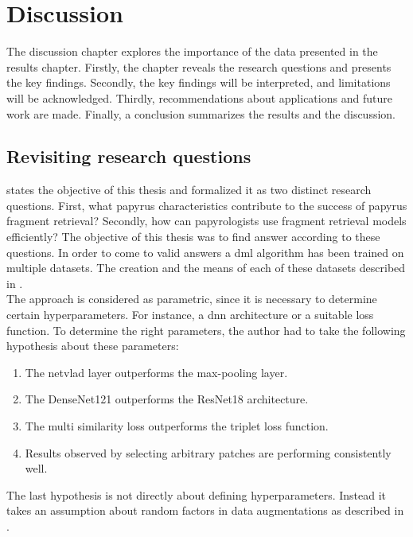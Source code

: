 \chapter{Discussion}
\label{chap:discussion}
The discussion chapter explores the importance of the data presented in the results chapter. Firstly, the chapter reveals the research questions and presents the key findings. Secondly, the key findings will be interpreted, and limitations will be acknowledged. Thirdly, recommendations about applications and future work are made. Finally, a conclusion summarizes the results and the discussion. 

\section{Revisiting research questions}
 states the objective of this thesis and formalized it as two distinct research questions. First, what papyrus characteristics contribute to the success of papyrus fragment retrieval? Secondly, how can papyrologists use fragment retrieval models efficiently? The objective of this thesis was to find answer according to these questions. In order to come to valid answers a \ac{dml} algorithm has been trained on multiple datasets. The creation and the means of each of these datasets described in .\\

\noindent The approach is considered as parametric, since it is necessary to determine certain hyperparameters. For instance, a \ac{dnn} architecture or a suitable loss function. To determine the right parameters, the author had to take the following hypothesis about these parameters:
%
\begin{enumerate}
	\item The \ac{netvlad} layer outperforms the max-pooling layer.
	\item The DenseNet121 outperforms the ResNet18 architecture.
	\item The multi similarity loss outperforms the triplet loss function.
	\item Results observed by selecting arbitrary patches are performing consistently well. 
\end{enumerate}
The last hypothesis is not directly about defining hyperparameters. Instead it takes an assumption about random factors in data augmentations as described in .
%
